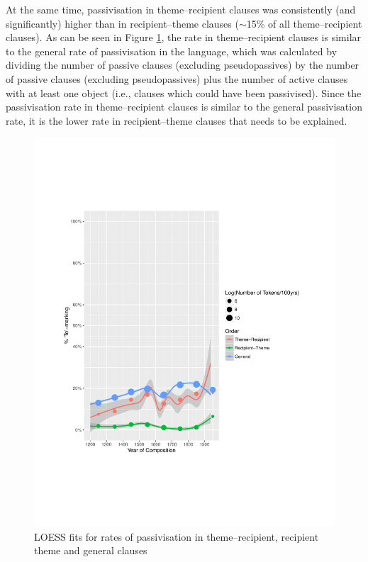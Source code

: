 	At the same time, passivisation in theme--recipient clauses was consistently (and significantly) higher than in recipient--theme clauses ($\sim$15\% of all theme--recipient clauses). As can be seen in Figure \ref{fig:brit-pas}, the rate in theme--recipient clauses is similar to the general rate of passivisation in the language, which was calculated by dividing the number of passive clauses (excluding pseudopassives) by the number of passive clauses (excluding pseudopassives) plus the number of active clauses with at least one object (i.e., clauses which could have been passivised). Since the passivisation rate in theme--recipient clauses is similar to the general passivisation rate, it is the lower rate in recipient--theme clauses that needs to be explained.

	\begin{figure}[ht!]
		\includegraphics[width=\linewidth]{../images/brit-pas}
		\caption{LOESS fits for rates of passivisation in theme--recipient, recipient theme and general clauses}
		\label{fig:brit-pas}
	\end{figure}

